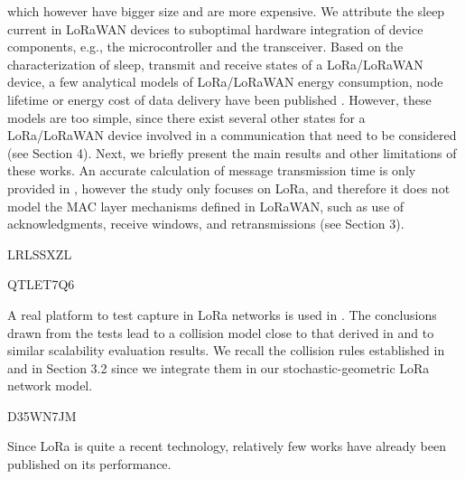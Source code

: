 	which however have bigger size and are more expensive.
We attribute the sleep current in LoRaWAN devices to suboptimal hardware integration of device components,
	e.g.,
	the microcontroller and the transceiver.
Based on the characterization of sleep,
	transmit and receive states of a LoRa/LoRaWAN device,
	a few analytical models of LoRa/LoRaWAN energy consumption,
	node lifetime or energy cost of data delivery have been published  \cite{kim_cooperative_2017}
\cite{conus_event-driven_2016}
\cite{sartori_smart_2016}
\cite{toussaint_performance_2016}.
However,
	these models are too simple,
	since there exist several other states for a LoRa/LoRaWAN device involved in a communication that need to be considered (see Section 4).
Next,
	we briefly present the main results and other limitations of these works.
An accurate calculation of message transmission time is only provided in \cite{sartori_smart_2016},
	however the study only focuses on LoRa,
	and therefore it does not model the MAC layer mechanisms defined in LoRaWAN,
	such as use of acknowledgments,
	receive windows,
	and retransmissions (see Section 3).




\cite{barro_lorawan_nodate} LRLSSXZL





\cite{blaszczyszyn_analyzing_2019} QTLET7Q6



A real platform to test capture in LoRa networks is used in \cite{bor_lora_2016}.
The conclusions drawn from the tests lead to a collision model close to that derived in \cite{jetmir_haxhibeqiri_lora_2017} and to similar scalability evaluation results.
We recall the collision rules established in \cite{jetmir_haxhibeqiri_lora_2017} and \cite{bor_lora_2016} in Section 3.2 since we integrate them in our stochastic-geometric LoRa network model.

\cite{piva_impact_2017} D35WN7JM

Since LoRa is quite a recent technology,
	relatively few works have already been published on its performance.

